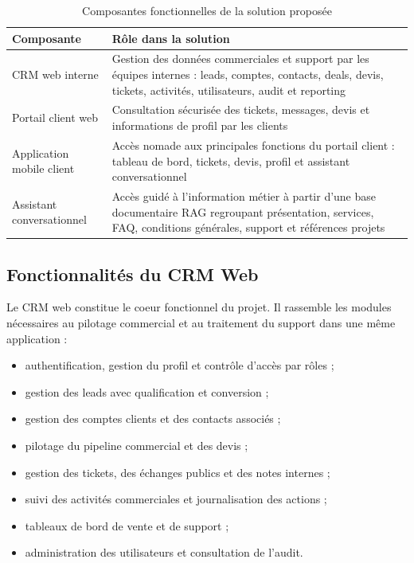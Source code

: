 \begin{table}[H]
\centering
\caption{Composantes fonctionnelles de la solution proposée}
\label{tab:volets}
\begin{tabularx}{\textwidth}{|l|X|}
\hline
\textbf{Composante} & \textbf{Rôle dans la solution} \\
\hline
CRM web interne & Gestion des données commerciales et support par les équipes internes : leads, comptes, contacts, deals, devis, tickets, activités, utilisateurs, audit et reporting \\
\hline
Portail client web & Consultation sécurisée des tickets, messages, devis et informations de profil par les clients \\
\hline
Application mobile client & Accès nomade aux principales fonctions du portail client : tableau de bord, tickets, devis, profil et assistant conversationnel \\
\hline
Assistant conversationnel & Accès guidé à l'information métier à partir d'une base documentaire RAG regroupant présentation, services, FAQ, conditions générales, support et références projets \\
\hline
\end{tabularx}
\end{table}

\subsection{Fonctionnalités du CRM Web}
Le CRM web constitue le coeur fonctionnel du projet. Il rassemble les modules nécessaires au pilotage commercial et au traitement du support dans une même application :
\begin{itemize}
    \item authentification, gestion du profil et contrôle d'accès par rôles ;
    \item gestion des leads avec qualification et conversion ;
    \item gestion des comptes clients et des contacts associés ;
    \item pilotage du pipeline commercial et des devis ;
    \item gestion des tickets, des échanges publics et des notes internes ;
    \item suivi des activités commerciales et journalisation des actions ;
    \item tableaux de bord de vente et de support ;
    \item administration des utilisateurs et consultation de l'audit.
\end{itemize}

